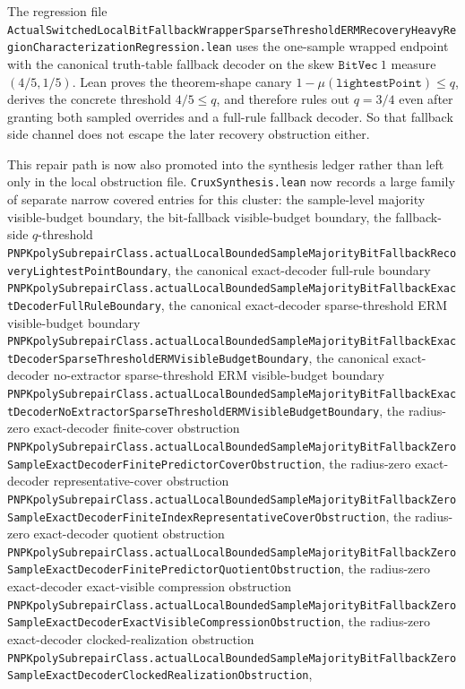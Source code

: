 \documentclass[11pt]{article}
\theoremstyle{remark}
\begin{document}
The regression file
\texttt{ActualSwitchedLocalBitFallbackWrapperSparseThresholdERMRecoveryHeavyRegionCharacterizationRegression.lean}
uses the one-sample wrapped endpoint with the canonical truth-table fallback
decoder on the skew \(\texttt{BitVec}\ 1\) measure \((4/5,1/5)\).  Lean proves
the theorem-shape canary \(1-\mu(\texttt{lightestPoint}) \le q\), derives the
concrete threshold \(4/5 \le q\), and therefore rules out \(q = 3/4\) even
after granting both sampled overrides and a full-rule fallback decoder.  So
that fallback side channel does not escape the later recovery obstruction
either.

This repair path is now also promoted into the synthesis ledger rather than
left only in the local obstruction file.  \texttt{CruxSynthesis.lean} now
records a large family of separate narrow covered entries for this cluster: the sample-level
majority visible-budget boundary, the bit-fallback visible-budget boundary, the
fallback-side \(q\)-threshold
\texttt{PNPKpolySubrepairClass.actualLocalBoundedSampleMajorityBitFallbackRecoveryLightestPointBoundary},
the canonical exact-decoder full-rule boundary
\texttt{PNPKpolySubrepairClass.actualLocalBoundedSampleMajorityBitFallbackExactDecoderFullRuleBoundary},
the canonical exact-decoder sparse-threshold ERM visible-budget boundary
\texttt{PNPKpolySubrepairClass.actualLocalBoundedSampleMajorityBitFallbackExactDecoderSparseThresholdERMVisibleBudgetBoundary},
the canonical exact-decoder no-extractor sparse-threshold ERM visible-budget boundary
\texttt{PNPKpolySubrepairClass.actualLocalBoundedSampleMajorityBitFallbackExactDecoderNoExtractorSparseThresholdERMVisibleBudgetBoundary},
the radius-zero exact-decoder finite-cover obstruction
\texttt{PNPKpolySubrepairClass.actualLocalBoundedSampleMajorityBitFallbackZeroSampleExactDecoderFinitePredictorCoverObstruction},
the radius-zero exact-decoder representative-cover obstruction
\texttt{PNPKpolySubrepairClass.actualLocalBoundedSampleMajorityBitFallbackZeroSampleExactDecoderFiniteIndexRepresentativeCoverObstruction},
the radius-zero exact-decoder quotient obstruction
\texttt{PNPKpolySubrepairClass.actualLocalBoundedSampleMajorityBitFallbackZeroSampleExactDecoderFinitePredictorQuotientObstruction},
the radius-zero exact-decoder exact-visible compression obstruction
\texttt{PNPKpolySubrepairClass.actualLocalBoundedSampleMajorityBitFallbackZeroSampleExactDecoderExactVisibleCompressionObstruction},
the radius-zero exact-decoder clocked-realization obstruction
\texttt{PNPKpolySubrepairClass.actualLocalBoundedSampleMajorityBitFallbackZeroSampleExactDecoderClockedRealizationObstruction},
\end{document}
